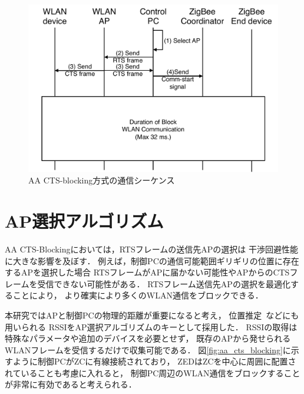 \documentclass[12pt]{jreport}
\begin{document}
\begin{figure}[bt]
 \centering
 \includegraphics[width=\columnwidth]{figure/sequence.pdf}
 \caption{AA CTS-blocking方式の通信シーケンス}
 \label{fig:sequence}
\end{figure}

\section{AP選択アルゴリズム}
\label{ssec:select_ap}

AA CTS-Blockingにおいては，RTSフレームの送信先APの選択は
干渉回避性能に大きな影響を及ぼす．
例えば，制御PCの通信可能範囲ギリギリの位置に存在するAPを選択した場合
RTSフレームがAPに届かない可能性やAPからのCTSフレームを受信できない可能性がある．
RTSフレーム送信先APの選択を最適化することにより，
より確実により多くのWLAN通信をブロックできる．

本研究ではAPと制御PCの物理的距離が重要になると考え，
位置推定~\cite{izumi13:awpn_acc_imprv}などにも用いられる
RSSIをAP選択アルゴリズムのキーとして採用した．
RSSIの取得は特殊なパラメータや追加のデバイスを必要とせず，
既存のAPから発せられるWLANフレームを受信するだけで収集可能である．
図\ref{fig:aa_cts_blocking}に示すように制御PCがZCに有線接続されており，
ZEDはZCを中心に周囲に配置されていることも考慮に入れると，
制御PC周辺のWLAN通信をブロックすることが非常に有効であると考えられる．
\end{document}
